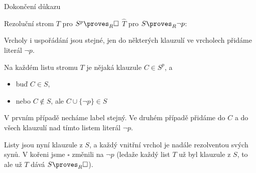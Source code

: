 \documentclass{beamer}
\begin{document}
\begin{frame}{Dokončení důkazu}

    Rezoluční strom \alert{$T$ pro $S^p\proves_R\square$} \scalebox{1.5}{$\rightsquigarrow$} \alert{$\widehat T$ pro $S\proves_R \neg p$}: \pause
    
    Vrcholy i uspořádání jsou stejné, jen do některých klauzulí ve vrcholech \alert{přidáme literál $\neg p$}. \pause
    
    Na každém listu stromu $T$ je nějaká klauzule $C\in S^p$, a\pause
    \begin{itemize}
        \item buď $C\in S$,\pause
        \item nebo $C\notin S$, ale $C\cup\{\neg p\}\in S$\pause
    \end{itemize}
    
    V prvním případě necháme label stejný. \pause Ve druhém případě přidáme do $C$ \alert{a do všech klauzulí nad tímto listem} literál $\neg p$.\pause 
    
    Listy jsou nyní klauzule z $S$, a každý vnitřní vrchol je nadále rezolventou svých synů. V kořeni jsme $\square$ změnili na $\neg p$ \pause(ledaže každý list $T$ už byl klauzule z $S$, to ale už $T$ dává $S\proves_R\square$). \hfill\qedsymbol

\end{frame}





    
    
\end{document}
